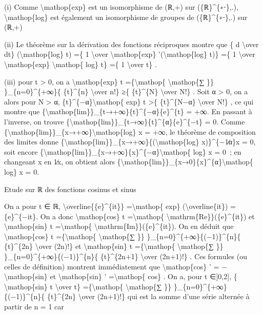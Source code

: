 \documentclass[]{article}
\begin{document}
(i) Comme \textbackslash{}mathop\{exp\} est un isomorphisme de (ℝ,+) sur
(\{ℝ\}\^{}\{∗⋅\},.), \textbackslash{}mathop\{log\} est également un
isomorphisme de groupes de (\{ℝ\}\^{}\{∗⋅\},.) sur (ℝ,+)

(ii) Le théorème sur la dérivation des fonctions réciproques montre que
\{ d \textbackslash{}over dt\} (\textbackslash{}mathop\{log\} t) =\{ 1
\textbackslash{}over \textbackslash{}mathop\{exp\}
'(\textbackslash{}mathop\{log\} t)\} =\{ 1 \textbackslash{}over
\textbackslash{}mathop\{exp\} \textbackslash{}mathop\{ log\} t\} =\{ 1
\textbackslash{}over t\} .

(iii) pour t \textgreater{} 0, on a \textbackslash{}mathop\{exp\} t
=\{\textbackslash{}mathop\{ \textbackslash{}mathop\{∑ \}\}
\}\_\{n=0\}\^{}\{+∞\}\{ \{t\}\^{}\{n\} \textbackslash{}over n!\} ≥\{
\{t\}\^{}\{N\} \textbackslash{}over N!\} . Soit α \textgreater{} 0, on a
alors pour N \textgreater{} α, \{t\}\^{}\{−α\}\textbackslash{}mathop\{
exp\} t \textgreater{}\{ \{t\}\^{}\{N−α\} \textbackslash{}over N!\} , ce
qui montre que
\{\textbackslash{}mathop\{lim\}\}\_\{t→+∞\}\{t\}\^{}\{−α\}\{e\}\^{}\{t\}
= +∞. En passant à l'inverse, on trouve
\{\textbackslash{}mathop\{lim\}\}\_\{t→∞\}\{t\}\^{}\{α\}\{e\}\^{}\{−t\}
= 0. Comme
\{\textbackslash{}mathop\{lim\}\}\_\{x→+∞\}\textbackslash{}mathop\{log\}
x = +∞, le théorème de composition des limites donne
\{\textbackslash{}mathop\{lim\}\}\_\{x→+∞\}\{(\textbackslash{}mathop\{log\}
x)\}\^{}\{−1∕α\}x = 0, soit encore
\{\textbackslash{}mathop\{lim\}\}\_\{x→+∞\}\{x\}\^{}\{−α\}\textbackslash{}mathop\{
log\} x = 0~; en changeant x en 1∕x, on obtient alors
\{\textbackslash{}mathop\{lim\}\}\_\{x→0\}\{x\}\^{}\{α\}\textbackslash{}mathop\{
log\} x = 0.

Etude sur ℝ des fonctions cosinus et sinus

On a pour t ∈ ℝ, \textbackslash{}overline\{\{e\}\^{}\{it\}\}
=\textbackslash{}mathop\{ exp\} (\textbackslash{}overline\{it\}) =
\{e\}\^{}\{−it\}. On a donc \textbackslash{}mathop\{cos\} t
=\textbackslash{}mathop\{
\textbackslash{}mathrm\{Re\}\}(\{e\}\^{}\{it\}) et
\textbackslash{}mathop\{sin\} t =\textbackslash{}mathop\{
\textbackslash{}mathrm\{Im\}\}(\{e\}\^{}\{it\}). On en déduit que
\textbackslash{}mathop\{cos\} t =\{\textbackslash{}mathop\{
\textbackslash{}mathop\{∑ \}\} \}\_\{n=0\}\^{}\{+∞\}\{(−1)\}\^{}\{n\}\{
\{t\}\^{}\{2n\} \textbackslash{}over (2n)!\} et
\textbackslash{}mathop\{sin\} t =\{\textbackslash{}mathop\{
\textbackslash{}mathop\{∑ \}\} \}\_\{n=0\}\^{}\{+∞\}\{(−1)\}\^{}\{n\}\{
\{t\}\^{}\{2n+1\} \textbackslash{}over (2n+1)!\} . Ces formules (ou
celles de définition) montrent immédiatement que
\textbackslash{}mathop\{cos\} ' = −\textbackslash{}mathop\{sin\} et
\textbackslash{}mathop\{sin\} ' =\textbackslash{}mathop\{ cos\} . On a,
pour t ∈{]}0,2{]}, \{ \textbackslash{}mathop\{sin\} t
\textbackslash{}over t\} =\{\textbackslash{}mathop\{
\textbackslash{}mathop\{∑ \}\} \}\_\{n=0\}\^{}\{+∞\}\{(−1)\}\^{}\{n\}\{
\{t\}\^{}\{2n\} \textbackslash{}over (2n+1)!\} qui est la somme d'une
série alternée à partir de n = 1 car
\end{document}
